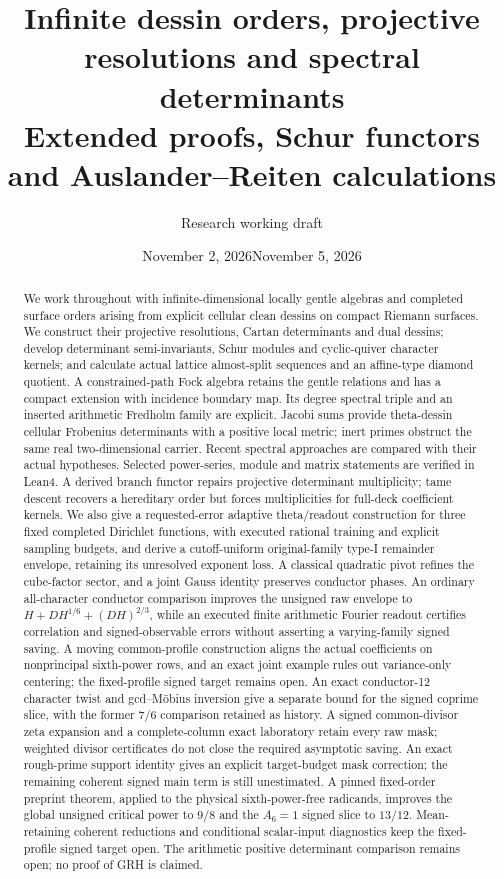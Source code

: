 \documentclass[11pt]{article}
\date{November 2, 2026}
\date{November 5, 2026}
\title{Infinite dessin orders, projective resolutions and spectral determinants\\\large Extended proofs, Schur functors and Auslander--Reiten calculations}
\author{Research working draft}
\theoremstyle{definition}\newtheorem{definition}[theorem]{Definition}
\theoremstyle{remark}\newtheorem{remark}[theorem]{Remark}
\begin{document}
\maketitle
\begin{abstract}
We work throughout with infinite-dimensional locally gentle algebras and completed surface orders arising from explicit cellular clean dessins on compact Riemann surfaces. We construct their projective resolutions, Cartan determinants and dual dessins; develop determinant semi-invariants, Schur modules and cyclic-quiver character kernels; and calculate actual lattice almost-split sequences and an affine-type diamond quotient. A constrained-path Fock algebra retains the gentle relations and has a compact extension with incidence boundary map. Its degree spectral triple and an inserted arithmetic Fredholm family are explicit. Jacobi sums provide theta-dessin cellular Frobenius determinants with a positive local metric; inert primes obstruct the same real two-dimensional carrier. Recent spectral approaches are compared with their actual hypotheses. Selected power-series, module and matrix statements are verified in Lean4. A derived branch functor repairs projective determinant multiplicity; tame descent recovers a hereditary order but forces multiplicities for full-deck coefficient kernels. We also give a requested-error adaptive theta/readout construction for three fixed completed Dirichlet functions, with executed rational training and explicit sampling budgets, and derive a cutoff-uniform original-family type-I remainder envelope, retaining its unresolved exponent loss. A classical quadratic pivot refines the cube-factor sector, and a joint Gauss identity preserves conductor phases. An ordinary all-character conductor comparison improves the unsigned raw envelope to $H+DH^{1/6}+(DH)^{2/3}$, while an executed finite arithmetic Fourier readout certifies correlation and signed-observable errors without asserting a varying-family signed saving. A moving common-profile construction aligns the actual coefficients on nonprincipal sixth-power rows, and an exact joint example rules out variance-only centering; the fixed-profile signed target remains open. An exact conductor-12 character twist and gcd--M\"obius inversion give a separate bound for the signed coprime slice, with the former $7/6$ comparison retained as history. A signed common-divisor zeta expansion and a complete-column exact laboratory retain every raw mask; weighted divisor certificates do not close the required asymptotic saving. An exact rough-prime support identity gives an explicit target-budget mask correction; the remaining coherent signed main term is still unestimated. A pinned fixed-order preprint theorem, applied to the physical sixth-power-free radicands, improves the global unsigned critical power to $9/8$ and the $A_6=1$ signed slice to $13/12$. Mean-retaining coherent reductions and conditional scalar-input diagnostics keep the fixed-profile signed target open. The arithmetic positive determinant comparison remains open; no proof of GRH is claimed.\end{abstract}
{\small\tableofcontents}
\end{document}
